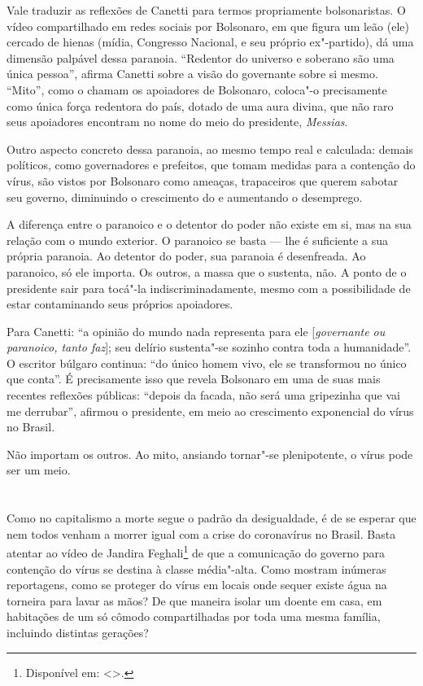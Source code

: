 Vale traduzir as reflexões de Canetti para termos propriamente
bolsonaristas. O vídeo compartilhado em redes sociais por Bolsonaro, em
que figura um leão (ele) cercado de hienas (mídia, Congresso Nacional,
 e seu próprio ex"-partido), dá uma dimensão palpável dessa paranoia.
``Redentor do universo e soberano são uma única pessoa'', afirma Canetti
sobre a visão do governante sobre si mesmo. ``Mito'', como o chamam os
apoiadores de Bolsonaro, coloca"-o precisamente como única força
redentora do país, dotado de uma aura divina, que não raro seus
apoiadores encontram no nome do meio do presidente, \emph{Messias}.

Outro aspecto concreto dessa paranoia, ao mesmo tempo real e calculada:
demais políticos, como governadores e prefeitos, que tomam medidas para
a contenção do vírus, são vistos por Bolsonaro como ameaças, trapaceiros
que querem sabotar seu governo, diminuindo o crescimento do  e
aumentando o desemprego.

A diferença entre o paranoico e o detentor do poder não existe em si,
mas na sua relação com o mundo exterior. O paranoico se basta --- lhe é
suficiente a sua própria paranoia. Ao detentor do poder, sua paranoia é
desenfreada. Ao paranoico, só ele importa. Os outros, a massa que o
sustenta, não. A ponto de o presidente sair para tocá"-la
indiscriminadamente, mesmo com a possibilidade de estar contaminando
seus próprios apoiadores.

Para Canetti: ``a opinião do mundo nada representa para ele
{[}\emph{governante ou paranoico, tanto faz}{]}; seu delírio sustenta"-se
sozinho contra toda a humanidade''. O escritor búlgaro continua: ``do
único homem vivo, ele se transformou no único que conta''. É
precisamente isso que revela Bolsonaro em uma de suas mais recentes
reflexões públicas: ``depois da facada, não será uma gripezinha que vai
me derrubar'', afirmou o presidente, em meio ao crescimento exponencial
do vírus no Brasil.

Não importam os outros. Ao mito, ansiando tornar"-se plenipotente, o
vírus pode ser um meio.

\section*{}

Como no capitalismo a morte segue o padrão da desigualdade, é de se
esperar que nem todos venham a morrer igual com a crise do coronavírus
no Brasil. Basta atentar
ao vídeo de
Jandira Feghali\footnote{Disponível em: \textless{}{}\textgreater{}.} de que a comunicação do governo para contenção do vírus
se destina à classe média"-alta. Como mostram inúmeras reportagens, como
se proteger do vírus em locais onde sequer existe água na torneira para
lavar as mãos? De que maneira isolar um doente em casa, em habitações de
um só cômodo compartilhadas por toda uma mesma família, incluindo
distintas gerações?

